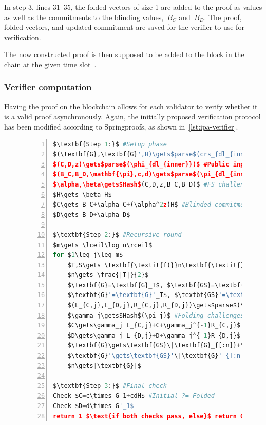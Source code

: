 In step 3, lines 31--35, the folded vectors of size 1 are added to the proof as values as well as the commitments to the blinding values,~$B_C$ and~$B_D$.
The proof, folded vectors, and updated commitment are saved for the verifier to use for verification.


The now constructed proof is then supposed to be added to the block in the chain at the given time slot~\cite{Whisk2024}.

\subsubsection*{Verifier computation}
Having the proof on the blockchain allows for each validator to verify whether it is a valid proof asynchronously.
Again, the initially proposed verification protocol has been modified according to Springproofs, as shown in~\autoref{lst:ipa-verifier}.

\begin{figure}[!htb]
\begin{lstlisting}[language=Python,mathescape=true,label={lst:ipa-verifier},numbers=left,caption={Verifier computation for CAAU-IPA in CAAUrdleproofs},captionpos=b,frame=single]
$\textbf{Step 1:}$ #Setup phase
$(\textbf{G},\textbf{G}',H)\gets$parse$(crs_{dl_{inner}})$
$(C,D,z)\gets$parse$(\phi_{dl_{inner}})$ #Public input
$(B_C,B_D,\mathbf{\pi},c,d)\gets$parse$(\pi_{dl_{inner}})$ #From prover
$\alpha,\beta\gets$Hash$(C,D,z,B_C,B_D)$ #FS challenges
$H\gets \beta H$
$C\gets B_C+\alpha C+(\alpha^2z)H$ #Blinded commitments
$D\gets B_D+\alpha D$

$\textbf{Step 2:}$ #Recursive round
$m\gets \lceil\log n\rceil$
for $1\leq j\leq m$
    $T,S\gets \textbf{\textit{f(}}n\textbf{\textit{)}}$ #Scheme function
    $n\gets \frac{|T|}{2}$
    $\textbf{G}=\textbf{G}_T$, $\textbf{GS}=\textbf{G}_S$ #Vector splitting
    $\textbf{G}'=\textbf{G}'_T$, $\textbf{GS}'=\textbf{G}'_T$
    $(L_{C,j},L_{D,j},R_{C,j},R_{D,j})\gets$parse$(\pi_j)$ #Proof elem
    $\gamma_j\gets$Hash$(\pi_j)$ #Folding challenges
    $C\gets\gamma_j L_{C,j}+C+\gamma_j^{-1}R_{C,j}$ #Update comms
    $D\gets\gamma_j L_{D,j}+D+\gamma_j^{-1}R_{D,j}$
    $\textbf{G}\gets\textbf{GS}\|\textbf{G}_{[:n]}+\gamma_j\textbf{G}_{[n:]}$ #Next round vectors
    $\textbf{G}'\gets\textbf{GS}'\|\textbf{G}'_{[:n]}+\gamma_j^{-1}\textbf{G}'_{[n:]}$
    $n\gets|\textbf{G}|$

$\textbf{Step 3:}$ #Final check
Check $C=c\times G_1+cdH$ #Initial ?= Folded
Check $D=d\times G'_1$
return 1 $\text{if both checks pass, else}$ return 0
\end{lstlisting}
\label{fig:ipa-verifier}
\end{figure}

